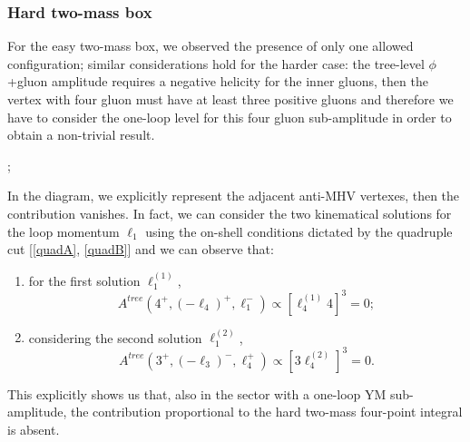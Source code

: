 \subsubsection{Hard two-mass box}
For the easy two-mass box, we observed the presence of only one allowed configuration; similar considerations hold for the harder case: the tree-level $\phi$+gluon amplitude requires a negative helicity for the inner gluons, then the vertex with four gluon must have at least three positive gluons and therefore we have to consider the one-loop level for this four gluon sub-amplitude in order to obtain a non-trivial result.
\begin{paracol}{2}
\begin{center}
;
\end{center}
\switchcolumn
In the diagram, we explicitly represent the adjacent anti-MHV vertexes, then the contribution vanishes. In fact, we can consider the two kinematical solutions for the loop momentum $\ell_1$ using the on-shell conditions dictated by the quadruple cut [\ref{quadA}, \ref{quadB}] and we can observe that:
\begin{enumerate}
\item for the first solution $\ell_1^{(1)}$,
		$$A^{tree}(4^+,(-\ell_4)^+,\ell_1^-) 
	\propto [ \ell_4^{(1)} 4 ]^3=0;$$
\item considering the second solution $\ell_1^{(2)}$,
	$$A^{tree}(3^+,(-\ell_3)^-,\ell_4^+) 
	\propto [3\ell_4^{(2)}]^3=0.$$
\end{enumerate}
\end{paracol}
This explicitly shows us that, also in the sector with a one-loop YM sub-amplitude, the contribution proportional to the hard two-mass four-point integral is absent.
